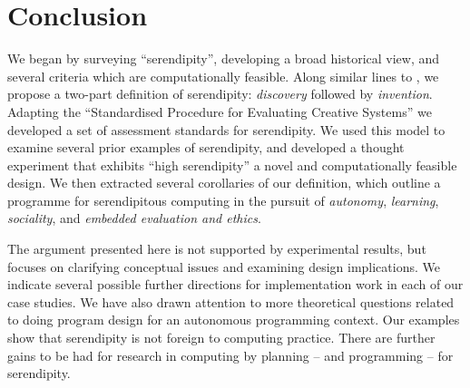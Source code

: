 \section{Conclusion} \label{sec:conclusion}

%
We began by surveying ``serendipity'', developing a broad historical
view, and several criteria which are computationally feasible.  Along
similar lines to , we propose a two-part
definition of serendipity: \emph{discovery} followed by
\emph{invention}.
%
Adapting the ``Standardised Procedure for Evaluating Creative
Systems'' we developed a set of assessment standards for serendipity.
%
We used this model to examine several prior examples of serendipity,
and developed a thought experiment that exhibits ``high serendipity''
a novel and computationally feasible design.
%
We then extracted several corollaries of our definition, which outline
a programme for serendipitous computing in the pursuit of
\emph{autonomy}, \emph{learning}, \emph{sociality}, and \emph{embedded
  evaluation and ethics}.

The argument presented here is not supported by experimental results,
but focuses on clarifying conceptual issues and examining design
implications.
% 
We indicate several possible further directions for implementation
work in each of our case studies.  We have also drawn attention to
more theoretical questions related to doing program design for an
autonomous programming context.  Our examples show that serendipity is
not foreign to computing practice.  There are further gains to be had
for research in computing by planning -- and programming -- for
serendipity.
%

